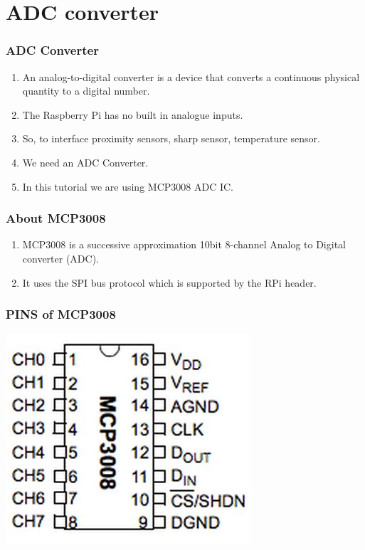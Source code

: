 \documentclass[10pt,red]{beamer}
\title
[
	Raspberry Pi Hardware Development	%
	\hspace{0.5cm}
	\insertframenumber/\inserttotalframenumber
]
{
	Interfacing Analog to Digital Converter IC
}
\author
[
	www.e-yantra.org
]
{
	e-Yantra Team \\
  Embedded Real-Time Systems Lab\\
  Indian Institute of Technology-Bombay \\
}
\date
{
IIT Bombay \\ {\today}
}
\begin{document}
 

\begin{frame}
	\titlepage
\end{frame}
\section{ADC converter} 
\begin{frame}
	\frametitle{ADC Converter} \pause
	\begin{enumerate}
		\item<+-|alert@+> An analog-to-digital converter is a device that converts a continuous physical quantity to a digital number.
		\item<+-|alert@+> The Raspberry Pi has no built in analogue inputs.
		\item<+-|alert@+> So, to interface proximity sensors, sharp sensor, temperature sensor.
		\item<+-|alert@+> We need an ADC Converter.
		\item<+-|alert@+> In this tutorial we are using MCP3008 ADC IC.
	\end{enumerate}
\end{frame}
\begin{frame}
	\frametitle{About MCP3008} \pause
	\begin{enumerate}
		\item<+-|alert@+> MCP3008 is a successive approximation 10bit 8-channel Analog to Digital converter (ADC).
		\item<+-|alert@+> It uses the SPI bus protocol which is supported by the RPi header.
	\end{enumerate}
\end{frame}
\begin{frame}
	\frametitle{PINS of MCP3008} \pause
	\centering
	\includegraphics[scale=0.7]{mcp3008}
\end{frame}
\end{document}
